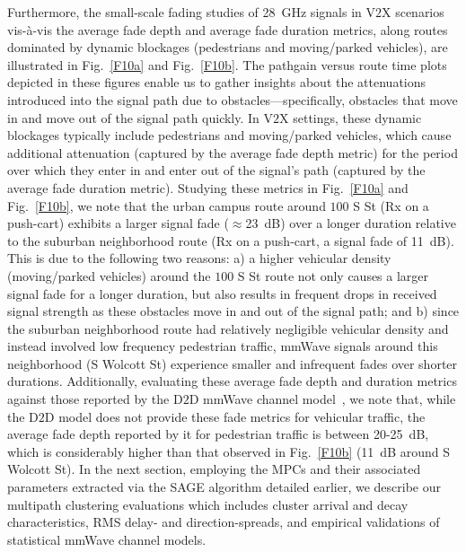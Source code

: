 \documentclass[12pt, draftcls, onecolumn]{IEEEtran}
\begin{document}
{Furthermore, the small-scale fading studies of \SI{28}{\giga\hertz} signals in V$2$X scenarios vis-à-vis the average fade depth and average fade duration metrics, along routes dominated by dynamic blockages (pedestrians and moving/parked vehicles), are illustrated in Fig.~\ref{F10a} and Fig.~\ref{F10b}. The pathgain versus route time plots depicted in these figures enable us to gather insights about the attenuations introduced into the signal path due to obstacles---specifically, obstacles that move in and move out of the signal path quickly. In V$2$X settings, these dynamic blockages typically include pedestrians and moving/parked vehicles, which cause additional attenuation (captured by the average fade depth metric) for the period over which they enter in and enter out of the signal's path (captured by the average fade duration metric). Studying these metrics in Fig.~\ref{F10a} and Fig.~\ref{F10b}, we note that the urban campus route around $100$ S St (Rx on a push-cart) exhibits a larger signal fade (${\approx}$\SI{23}{\deci\bel}) over a longer duration relative to the suburban neighborhood route (Rx on a push-cart, a signal fade of \SI{11}{\deci\bel}). This is due to the following two reasons: a) a higher vehicular density (moving/parked vehicles) around the $100$ S St route not only causes a larger signal fade for a longer duration, but also results in frequent drops in received signal strength as these obstacles move in and out of the signal path; and b) since the suburban neighborhood route had relatively negligible vehicular density and instead involved low frequency pedestrian traffic, mmWave signals around this neighborhood (S Wolcott St) experience smaller and infrequent fades over shorter durations. Additionally, evaluating these average fade depth and duration metrics against those reported by the D$2$D mmWave channel model~\cite{D2DHumanBlockage}, we note that, while the D$2$D model does not provide these fade metrics for vehicular traffic, the average fade depth reported by it for pedestrian traffic is between \SI{20}{}-\SI{25}{\deci\bel}, which is considerably higher than that observed in Fig.~\ref{F10b} (\SI{11}{\deci\bel} around S Wolcott St). In the next section, employing the MPCs and their associated parameters extracted via the SAGE algorithm detailed earlier, we describe our multipath clustering evaluations which includes cluster arrival and decay characteristics, RMS delay- and direction-spreads, and empirical validations of statistical mmWave channel models.
\vspace{-3mm}

}
\end{document}
